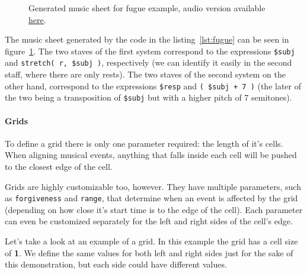 \documentclass[a4paper,UKenglish,cleveref, autoref]{oasics-v2019}
\begin{document}
\begin{figure}[ht]
  \centering
  {%
  \setlength{\fboxsep}{0pt}%
  \setlength{\fboxrule}{0pt}%
  }%
  \caption{Generated music sheet for fugue example, audio version available \href{https://drive.google.com/file/d/1dIfvnhhKn73Vpp0W6ss6RLsv6PQ_HFTF/view}{\underline{here}}\protect\footnotemark.}
  \label{fig:fugue}
\end{figure}

The music sheet generated by the code in the listing~\ref{lst:fugue} can be seen in figure~\ref{fig:fugue}. The two staves of the first system correspond to the expressions \texttt{\$subj} and \texttt{stretch( r, \$subj )}, respectively (we can identify it easily in the second staff, where there are only rests). The two staves of the second system on the other hand, correspond to the expressions \texttt{\$resp} and \texttt{( \$subj + 7 )} (the later of the two being a transposition of \texttt{\$subj} but with a higher pitch of 7 semitones).

\paragraph*{Grids}
To define a grid there is only one parameter required: the length of it's cells. When aligning musical events, anything that falls inside each cell will be pushed to the closest edge of the cell.

Grids are highly customizable too, however. They have multiple parameters, such as \texttt{forgiveness} and \texttt{range}, that determine when an event is affected by the grid (depending on how close it's start time is to the edge of the cell). Each parameter can even be customized separately for the left and right sides of the cell's edge.

Let's take a look at an example of a grid. In this example the grid has a cell size of \textbf{1}. We define the same values for both left and right sides just for the sake of this demonstration, but each side could have different values.
\end{document}
